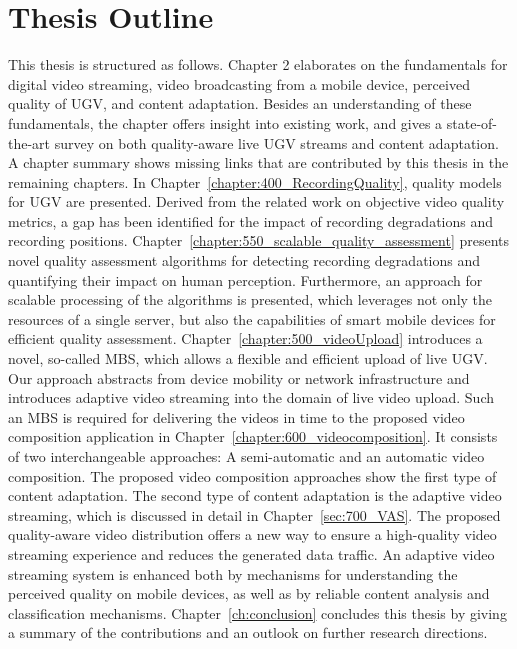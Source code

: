 \section{Thesis Outline}
This thesis is structured as follows. Chapter 2 elaborates on the fundamentals for digital video streaming, video broadcasting from a mobile device, perceived quality of \ac{UGV}, and content adaptation.
Besides an understanding of these fundamentals, the chapter offers insight into existing work, and gives a state-of-the-art survey on both quality-aware live \ac{UGV} streams and content adaptation.
A chapter summary shows missing links that are contributed by this thesis in the remaining chapters.
In Chapter~\ref{chapter:400_RecordingQuality}, quality models for \ac{UGV} are presented.
Derived from the related work on objective video quality metrics, a gap has been identified for the impact of recording degradations and recording positions.
Chapter~\ref{chapter:550_scalable_quality_assessment} presents novel quality assessment algorithms for detecting recording degradations and quantifying their impact on human perception.
Furthermore, an approach for scalable processing of the algorithms is presented, which leverages not only the resources of a single server, but also the capabilities of smart mobile devices for efficient quality assessment.
Chapter~\ref{chapter:500_videoUpload} introduces a novel, so-called \ac{MBS}, which allows a flexible and efficient upload of live \ac{UGV}. 
Our approach abstracts from device mobility or network infrastructure and introduces adaptive video streaming into the domain of live video upload.
Such an \ac{MBS} is required for delivering the videos in time to the proposed video composition application in Chapter~\ref{chapter:600_videocomposition}.
It consists of two interchangeable approaches: A semi-automatic and an automatic video composition.
The proposed video composition approaches show the first type of content adaptation. 
The second type of content adaptation is the adaptive video streaming, which is discussed in detail in Chapter~\ref{sec:700_VAS}.
The proposed quality-aware video distribution offers a new way to ensure a high-quality video streaming experience and reduces the generated data traffic.
An adaptive video streaming system is enhanced both by mechanisms for understanding the perceived quality on mobile devices, as well as by reliable content analysis and classification mechanisms.
Chapter~\ref{ch:conclusion} concludes this thesis by giving a summary of the contributions and an outlook on further research directions.
